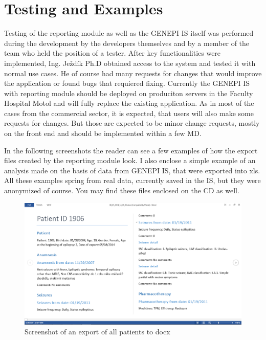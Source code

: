 \documentclass[thesis=B,english]{FITthesis}[2012/10/20]
\begin{document}
\chapter{Testing and Examples}

Testing of the reporting module as well as the GENEPI IS itself was performed during the development by the developers themselves and by a member of the team who held the position of a tester. After key  functionalities were implemented, Ing. Ježdík Ph.D obtained access to the system and tested it with normal use cases. He of course had many requests for changes that would improve the application or found bugs that requiered fixing. Currently the GENEPI IS with reporting module should be deployed on produciton servers in the Faculty Hospital Motol and will fully replace the existing application. As in most of the cases from the commercial sector, it is expected, that users will also make some requests for changes. But those are expected to be minor change requests, mostly on the front end and should be implemented within a few MD.

In the following screenshots the reader can see a few examples of how the export files created by the reporting module look. I also enclose a simple example of an analysis made on the basis of data from GENEPI IS, that were exported into xls. All these examples spring from real data, currently saved in the IS, but they were anonymized of course. You may find these files enclosed on the CD as well.

\begin{figure}
	\centering
 	\includegraphics[width=1\textwidth]{images/docxExport_1.png}
 	\caption{Screenshot of an export of all patients to docx}
 	\label{fig:docxExport_1}
\end{figure}
\end{document}
